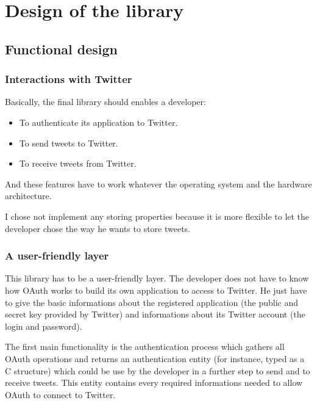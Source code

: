 \chapter{Design of the library}


\section{Functional design}

\subsection{Interactions with Twitter}

\hspace{15mm}Basically, the final library should enables a developer:
\begin{itemize}
\item To authenticate its application to Twitter. 
\item To send tweets to Twitter.
\item To receive tweets from Twitter.
\end{itemize}

And these features have to work whatever the operating system and the hardware architecture.

I chose not implement any storing properties because it is more flexible to let the developer chose the way he wants to store tweets.


\subsection{A user-friendly layer}

\hspace{15mm}This library has to be a user-friendly layer. The developer does not have to know how OAuth works to build its own application to access to Twitter. He just have to give the basic informations about the registered application (the public and secret key provided by Twitter) and informations about its Twitter account (the login and password).

The first main functionality is the authentication process which gathers all OAuth operations and returns an authentication entity (for instance, typed as a C structure) which could be use by the developer in a further step to send and to receive tweets. This entity contains every required informations needed to allow OAuth to connect to Twitter. 

